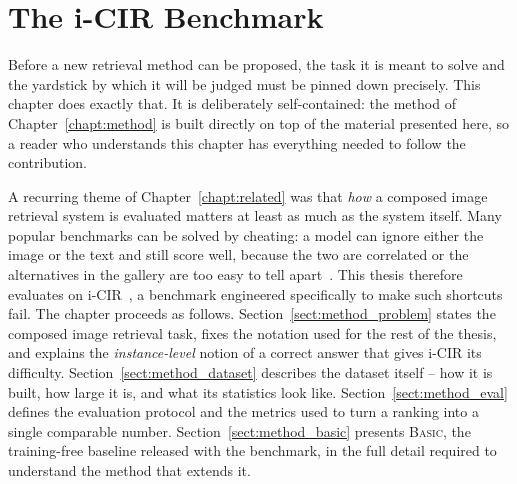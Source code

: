 %
%

\chapter{The i-CIR Benchmark}\label{chapt:benchmark}

Before a new retrieval method can be proposed, the task it is meant to solve
and the yardstick by which it will be judged must be pinned down precisely.
This chapter does exactly that. It is deliberately self-contained: the method
of Chapter~\ref{chapt:method} is built directly on top of the material presented
here, so a reader who understands this chapter has everything needed to follow
the contribution.

A recurring theme of Chapter~\ref{chapt:related} was that \emph{how} a composed
image retrieval system is evaluated matters at least as much as the system
itself. Many popular benchmarks can be solved by cheating: a model can ignore
either the image or the text and still score well, because the two are
correlated or the alternatives in the gallery are too easy to tell
apart~\cite{attimonelli2026circus}. This thesis therefore evaluates on
i-CIR~\cite{psomas2025icir}, a benchmark engineered specifically to make such
shortcuts fail. The chapter proceeds as follows.
Section~\ref{sect:method_problem} states the composed image retrieval task, fixes
the notation used for the rest of the thesis, and explains the \emph{instance-level}
notion of a correct answer that gives i-CIR its difficulty.
Section~\ref{sect:method_dataset} describes the dataset itself -- how it is built,
how large it is, and what its statistics look like.
Section~\ref{sect:method_eval} defines the evaluation protocol and the metrics
used to turn a ranking into a single comparable number.
Section~\ref{sect:method_basic} presents \textsc{Basic}, the training-free
baseline released with the benchmark, in the full detail required to understand
the method that extends it.

